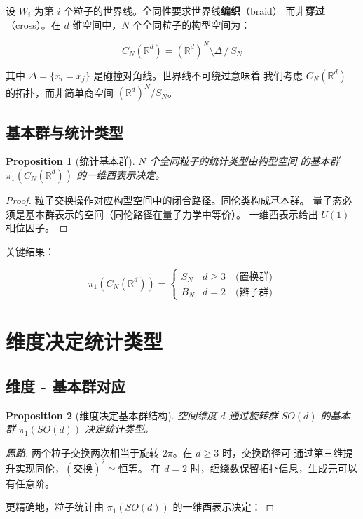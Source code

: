 \documentclass[11pt,a4paper]{article}
\newtheorem{proposition}{Proposition}[section]
\begin{document}
设 $W_i$ 为第 $i$ 个粒子的世界线。全同性要求世界线\textbf{编织}（braid）
而非\textbf{穿过}（cross）。在 $d$ 维空间中，$N$ 个全同粒子的构型空间为：

\begin{equation}
C_N(\mathbb{R}^d) = (\mathbb{R}^d)^N \setminus \Delta \,/\, S_N
\end{equation}

其中 $\Delta = \{x_i = x_j\}$ 是碰撞对角线。世界线不可绕过意味着
我们考虑 $C_N(\mathbb{R}^d)$ 的拓扑，而非简单商空间 $(\mathbb{R}^d)^N/S_N$。

\subsection{基本群与统计类型}

\begin{proposition}[统计基本群]
$N$ 个全同粒子的统计类型由构型空间
的基本群 $\pi_1(C_N(\mathbb{R}^d))$ 的一维酉表示决定。
\end{proposition}

\begin{proof}
粒子交换操作对应构型空间中的闭合路径。同伦类构成基本群。
量子态必须是基本群表示的空间（同伦路径在量子力学中等价）。
一维酉表示给出 $U(1)$ 相位因子。
\end{proof}

关键结果：

\begin{equation}
\pi_1(C_N(\mathbb{R}^d)) =
\begin{cases}
S_N & d \geq 3 \quad\text{(置换群)} \\
B_N & d = 2 \quad\text{(辫子群)}
\end{cases}
\end{equation}

\section{维度决定统计类型}

\subsection{维度 - 基本群对应}

\begin{proposition}[维度决定基本群结构]
空间维度 $d$ 通过旋转群 $SO(d)$ 的基本群 $\pi_1(SO(d))$ 决定统计类型。
\end{proposition}

\begin{proof}[思路]
两个粒子交换两次相当于旋转 $2\pi$。在 $d \geq 3$ 时，交换路径可
通过第三维提升实现同伦，$(\text{交换})^2 \simeq \text{恒等}$。
在 $d = 2$ 时，缠绕数保留拓扑信息，生成元可以有任意阶。

更精确地，粒子统计由 $\pi_1(SO(d))$ 的一维酉表示决定：
\end{proof}
\end{document}

